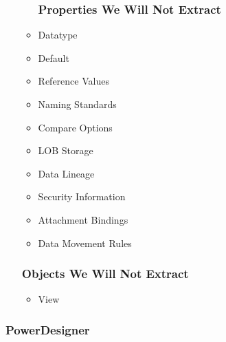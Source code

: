 \documentclass[12pt,a4paper]{report}
\begin{document}
\begin{itemize}
\begin{itemize}
		\subsubsection{Properties We Will Not Extract}
		\item Datatype
		\item Default
		\item Reference Values
		\item Naming Standards
		\item Compare Options
		\item LOB Storage
		\item Data Lineage
		\item Security Information
		\item Attachment Bindings
		\item Data Movement Rules
	\end{itemize}
	\subsubsection{Objects We Will Not Extract}
	\begin{itemize}
		\item View
	\end{itemize}
\end{itemize}

\subsubsection{PowerDesigner}
\end{document}
